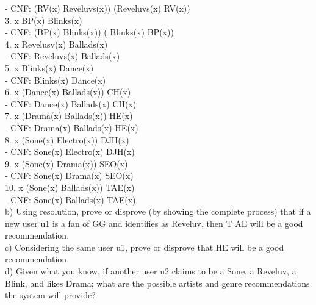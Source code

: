 \documentclass{article}
\begin{document}
\: \: \: \: - CNF: (\neg RV(x) \vee Reveluvs(x)) \wedge (\neg Reveluvs(x) \vee RV(x))\\

3. \forall x \: BP(x) \Leftrightarrow Blinks(x)\\

\: \: \: \: - CNF: (\neg BP(x) \vee Blinks(x)) \wedge ( \neg Blinks(x) \vee BP(x))\\

4. \forall x \: Revelusv(x) \Rightarrow Ballads(x)\\

\: \: \: \: - CNF: \neg Reveluvs(x) \wedge Ballads(x)\\

5. \forall x \: Blinks(x) \Rightarrow Dance(x)\\

\: \: \: \: - CNF: \neg Blinks(x) \vee Dance(x)\\

6. \forall x \: (Dance(x) \wedge Ballads(x)) \Rightarrow CH(x)\\

\: \: \: \: - CNF: \neg Dance(x) \vee \neg Ballads(x) \vee CH(x)\\

7. \forall x \: (Drama(x) \wedge Ballads(x)) \Rightarrow HE(x)\\

\: \: \: \: - CNF: \neg Drama(x) \vee \neg Ballads(x) \vee HE(x)\\

8. \forall x \: (Sone(x) \wedge Electro(x)) \Rightarrow DJH(x)\\

\: \: \: \: - CNF: \neg Sone(x) \vee \neg Electro(x) \vee DJH(x)\\

9. \forall x \: (Sone(x) \wedge Drama(x)) \Rightarrow SEO(x)\\

\: \: \: \: - CNF: \neg Sone(x) \vee \neg Drama(x) \vee SEO(x)\\

10. \forall x \: (Sone(x) \wedge Ballads(x)) \Rightarrow TAE(x)\\

\: \: \: \: - CNF: \neg Sone(x) \vee \neg Ballads(x) \vee TAE(x)\\

b) Using resolution, prove or disprove (by showing the complete process) that if a new user u1 is a fan of GG and identifies as Reveluv, then T AE will be a good recommendation.\\


c) Considering the same user u1, prove or disprove that HE will be a good recommendation.\\


d) Given what you know, if another user u2 claims to be a Sone, a Reveluv, a Blink, and likes Drama;
what are the possible artists and genre recommendations the system will provide? \\
\end{document}
